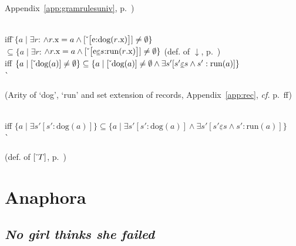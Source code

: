 \begin{ex}
\begin{subex}
\begin{tabbing}
\begin{minipage}{.3\textwidth}
     Appendix~\ref{app:gramrulesuniv}, p.~\pageref{pg:property-restriction})\end{minipage}\\
\> iff \=$\{a\mid\exists r$:
  $\wedge
  r.\text{x}=a\wedge\down{\text{\smallrecord{\smalltfield{e}{dog($r$.x)}}}}\not=\emptyset\}$\\
\>\>$\subseteq\{a\mid\exists r$:
  $\wedge
  r.\text{x}=a\wedge\down{\text{\smallrecord{\smallrfield{e}{$s$}{run($r$.x)}}}}\not=\emptyset\}$
  \hspace*{2em}(def. of $\downarrow$, p.~\pageref{pg:property-extension-rev})
  \\
\> iff
$\{a\mid[\ \!\check{}\ \!\text{dog}(a)]\not=\emptyset\}\subseteq\{a\mid[\ \!\check{}\ \!\text{dog}(a)]\not=\emptyset\wedge\exists
s'[s'\underline{\varepsilon}s\wedge
s':\text{run}(a)]\}$\\
\>\`\begin{minipage}{.3\textwidth}(Arity of `dog', `run' and set
extension of records, Appendix~\ref{app:rec}, \textit{cf.} p.~\pageref{pg:set-reduction-gq}ff)\end{minipage}\\ 
\> iff $\{a\mid\exists s'[s':\text{dog}(a)]\}\subseteq\{a\mid\exists
s'[s':\text{dog}(a)]\wedge\exists
s'[s'\underline{\varepsilon}s\wedge s':\text{run}(a)]\}$ \\
\>\`\begin{minipage}{.3\textwidth}(def. of $[\ \!\check{}\ \!T]$, p.~\pageref{pg:type-extension})\end{minipage}
\end{tabbing} 
\end{subex} 
   
\end{ex} 
  


\section{Anaphora}
\label{sec:anaph}

\subsection{\textit{No girl thinks she failed}}

